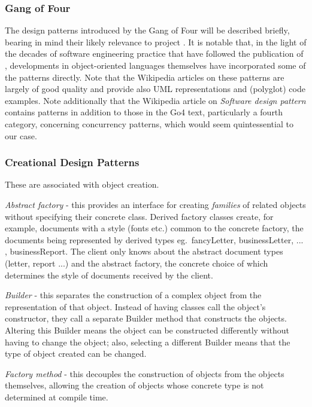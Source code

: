 \subsubsection{Gang of Four}\label{sec:gang4}


The design patterns introduced by the Gang of Four will be described briefly, bearing in mind their likely relevance to project \nep.
It is notable that, in the light of the decades of software engineering practice that have followed the publication of \cite{gammahelmjohnsonvlissides}, developments in object-oriented languages themselves have incorporated some of the patterns directly.
Note that the Wikipedia articles on these patterns are largely of good quality and provide also UML representations and (polyglot) code examples.
Note additionally that the Wikipedia article on {\it Software design pattern} \cite{softwarepatternwiki} contains patterns in addition to those in the Go4 text, particularly a fourth category, concerning concurrency patterns, which would seem quintessential to our case.

\subsubsection*{Creational Design Patterns}

These are associated with object creation.

{\it Abstract factory} - this provides an interface for creating {\it families} of related objects without specifying their concrete class.
Derived factory classes create, for example, documents with a style (fonts etc.) common to the concrete factory, the documents being represented by derived types eg.\ fancyLetter, businessLetter, ... , businessReport.  The client only knows about the abstract document types (letter, report ...) and the abstract factory, the concrete choice of which determines the style of documents received by the client.

{\it Builder} - this separates the construction of a complex object from the representation of that object.
Instead of having classes call the object's constructor, they call a separate Builder method that constructs the objects.
Altering this Builder means the object can be constructed differently without having to change the object; also, selecting a different Builder means that the type of object created can be changed.

{\it Factory method} - this decouples the construction of objects from the objects themselves, allowing the creation of objects whose concrete type is not determined at compile time.

